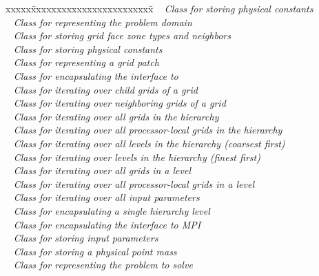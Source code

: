 \documentclass[10pt]{article}
\begin{document}
 \begin{tabbing}
xxxxx\=xxxxxxxxxxxxxxxxxxxxxxxx\=\kill
\> \done\ 
  \> \textit{Class for storing physical constants} \\
\> \done\ 
  \> \textit{Class for representing the problem domain} \\
\> \done\ 
  \> \textit{Class for storing grid face zone types and neighbors} \\
\> \done\ 
  \> \textit{Class for storing physical constants} \\
\> \done\ 
  \> \textit{Class for representing a grid patch} \\
\> \done\ 
  \> \textit{Class for encapsulating the interface to \hypre} \\
\> \done\ 
  \> \textit{Class for iterating over child grids of a grid} \\
\> \done\ 
  \> \textit{Class for iterating over neighboring grids of a grid} \\
\> \done\ 
  \> \textit{Class for iterating over all grids in the hierarchy} \\
\> \done\ 
  \> \textit{Class for iterating over all processor-local grids in the hierarchy} \\
\> \done\ 
  \> \textit{Class for iterating over all levels in the hierarchy (coarsest first)} \\
\> \done\ 
  \> \textit{Class for iterating over levels in the hierarchy (finest first)} \\
\> \done\ 
  \> \textit{Class for iterating over all grids in a level} \\
\> \done\ 
  \> \textit{Class for iterating over all processor-local grids in a level} \\
\> \done\ 
  \> \textit{Class for iterating over all input parameters} \\
\> \done\ 
  \> \textit{Class for encapsulating a single hierarchy level} \\
\> \done\ 
  \> \textit{Class for encapsulating the interface to MPI} \\
\> \done\ 
  \> \textit{Class for storing input parameters} \\
\> \done\ 
  \> \textit{Class for storing a physical point mass} \\
\> \done\ 
  \> \textit{Class for representing the problem to solve} \\
\end{tabbing}
\end{document}
